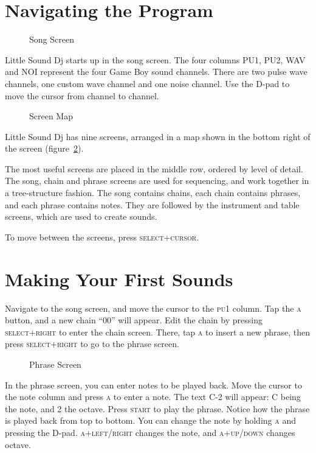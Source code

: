 \section{Navigating the Program}

\begin{figure}[hbtp]
\centering
{}
\caption{Song Screen}
\label{fig:song}
\end{figure}

Little Sound Dj starts up in the song screen.
The four columns \textsc{PU1, PU2, WAV} and \textsc{NOI} represent the four Game Boy sound channels.
There are two pulse wave channels, one custom wave channel and one noise channel.
Use the D-pad to move the cursor from channel to channel.

\begin{figure}[hbtp]
\centering
{}
\caption{Screen Map}
\label{fig:map}
\end{figure}

Little Sound Dj has nine screens, arranged in a map shown in the
bottom right of the screen (figure~\ref{fig:map}). 

The most useful screens are placed in the middle row, ordered by level of detail. 
The song, chain and phrase screens are used for sequencing, and work together in a tree-structure
fashion.  The song contains chains, each chain contains phrases, and each phrase contains notes.
They are followed by the instrument and table screens, which are used to create sounds.

To move between the screens, press \textsc{select+cursor}.

\section{Making Your First Sounds}
Navigate to the song screen, and move the cursor to the \textsc{pu1} column. Tap the \textsc{a} button,
and a new chain ``00'' will appear.
Edit the chain by pressing \textsc{select+right} to enter the chain screen.
There, tap \textsc{a} to insert a new phrase, then press \textsc{select+right} to go to the phrase screen.

\begin{figure}[hbtp]
\centering
{}
\caption{Phrase Screen}
\label{fig:phrase1}
\end{figure}

In the phrase screen, you can enter notes to be played back. Move the cursor to the note
column and press \textsc{a} to enter a note. The text C-2 will appear: C being the note, and 2 the
octave. Press \textsc{start} to play the phrase. Notice how the phrase is played back from
top to bottom. You can change the note by holding \textsc{a} and pressing the
D-pad. \textsc{a+left/right} changes the note, and \textsc{a+up/down} changes octave.

